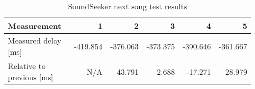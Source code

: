 \begin{table}[h]
\centering
\begin{tabular}{|l|r|r|r|r|r|}
\hline
Measurement          		& 1       	& 2       	& 3       & 4       & 5       \\ \hline
Measured delay [ms]       	& -419.854 	& -376.063 	& -373.375 & -390.646 & -361.667 \\ \hline
Relative to previous [ms] 	& N/A     	& 43.791 	& 2.688  & -17.271  & 28.979  \\ \hline
\end{tabular}
\caption{SoundSeeker next song test results}
\label{fig:soundseekernextsongfigure}
\end{table}
